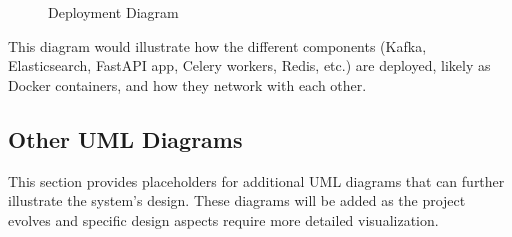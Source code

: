 \begin{figure}[H]
    \centering
    \caption{Deployment Diagram}
    \label{fig:deployment_diagram}
\end{figure}

This diagram would illustrate how the different components (Kafka, Elasticsearch, FastAPI app, Celery workers, Redis, etc.) are deployed, likely as Docker containers, and how they network with each other.

\subsection{Other UML Diagrams}
This section provides placeholders for additional UML diagrams that can further illustrate the system's design. These diagrams will be added as the project evolves and specific design aspects require more detailed visualization.





